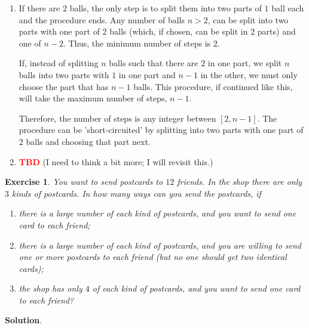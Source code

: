 \documentclass[11pt]{book}
\theoremstyle{definition}
\theoremstyle{plain}
\newtheorem{exercise}{Exercise}
\theoremstyle{definition}
\theoremstyle{problemstyle}
\theoremstyle{remark}
\theoremstyle{definition}
\newcommand{\tbd}{
    \vspace{5mm}
    \textbf{\textcolor{red}{\Large{TBD}}}
    \vspace{5mm}
}
\begin{document}
    \begin{enumerate}[label=(\alph*)]
        \item If there are $2$ balls, the only step is to split them into two parts of $1$ ball each and the procedure ends. Any number of balls $n>2$, can be split into two parts with one part of $2$ balls (which, if chosen, can be split in $2$ parts) and one of $n-2$. Thus, the minimum number of steps is $2$.

            If, instead of splitting $n$ balls such that there are $2$ in one part, we split $n$ balls into two parts with $1$ in one part and $n-1$ in the other, we must only choose the part that has $n-1$ balls. This procedure, if continued like this, will take the maximum number of steps, $n-1$.

            Therefore, the number of steps is any integer between $[2, n-1]$. The procedure can be 'short-circuited' by splitting into two parts with one part of $2$ balls and choosing that part next.

        \item \tbd (I need to think a bit more; I will revisit this.)
    \end{enumerate}
\begin{exercise}
    \label{ex:1.8.28}
    You want to send postcards to $12$ friends. In the shop there are only $3$ kinds of postcards. In how many ways can you send the postcards, if
    \begin{enumerate}[label=(\alph*)]
        \item there is a large number of each kind of postcards, and you want to send one card to each friend;
        \item there is a large number of each kind of postcards, and you are willing to send one or more postcards to each friend (but no one should get two identical cards);
        \item the shop has only $4$ of each kind of postcards, and you want to send one card to each friend?
    \end{enumerate}
\end{exercise}
\textbf{Solution}.
\end{document}
